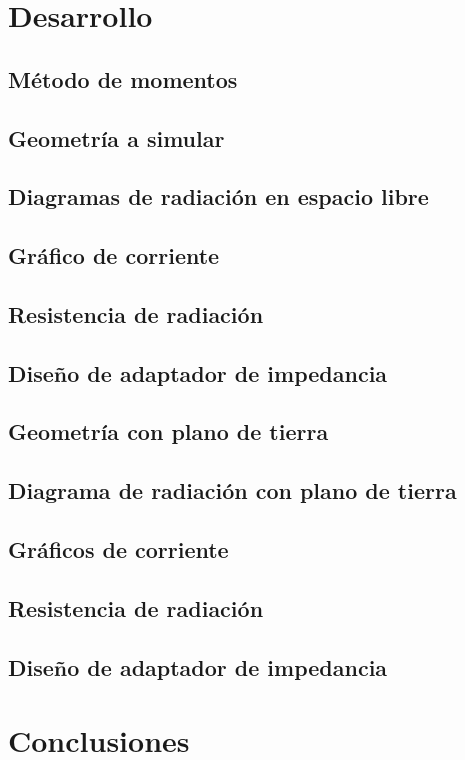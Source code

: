\documentclass[10pt,a4paper]{article}
\begin{document}
		
	\setcounter{page}{1}
	\section{Desarrollo}
		
		\subsection{Método de momentos}
			
		\subsection{Geometría a simular}
			
		\subsection{Diagramas de radiación en espacio libre}
			
		\subsection{Gráfico de corriente}
			
		\subsection{Resistencia de radiación}
			
		\subsection{Diseño de adaptador de impedancia}
			
		\subsection{Geometría con plano de tierra}
			
		\subsection{Diagrama de radiación con plano de tierra}
			
		\subsection{Gráficos de corriente}
			
		\subsection{Resistencia de radiación}
			
		\subsection{Diseño de adaptador de impedancia}
			

	\pagebreak					
	\section{Conclusiones}
		
		
\end{document}
